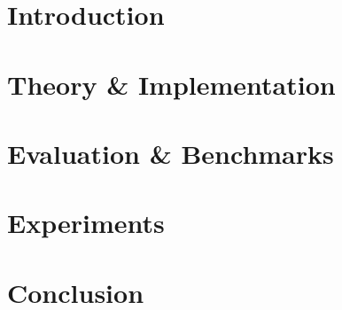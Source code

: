 \section{Introduction}


\section{Theory \& Implementation}\label{backpack::sec:theory-and-implementation}


\section{Evaluation \& Benchmarks}\label{backpack::sec:benchmark}


\section{Experiments}\label{backpack::sec:experiments}


\section{Conclusion}


